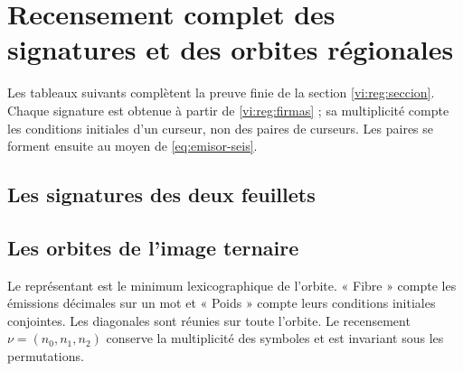\section{Recensement complet des signatures et des orbites régionales}
\label{vi:reg:tablas}

Les tableaux suivants complètent la preuve finie de la section
\ref{vi:reg:seccion}. Chaque signature est obtenue à partir de
\eqref{vi:reg:firmas} ; sa multiplicité compte les conditions
initiales d’un curseur, non des paires de curseurs. Les paires se
forment ensuite au moyen de \eqref{eq:emisor-seis}.

\subsection{Les signatures des deux feuillets}


\subsection{Les orbites de l’image ternaire}
Le représentant est le minimum lexicographique de l’orbite. « Fibre »
compte les émissions décimales sur un mot et « Poids » compte leurs
conditions initiales conjointes. Les diagonales sont réunies sur
toute l’orbite. Le recensement \(\nu=(n_0,n_1,n_2)\) conserve la
multiplicité des symboles et est invariant sous les permutations.

